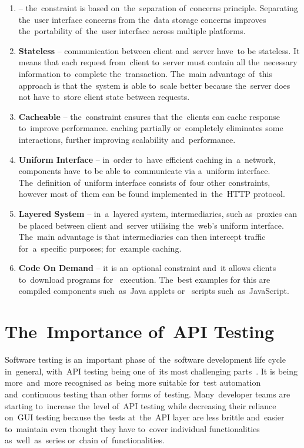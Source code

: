 \begin{enumerate}
  \item \textbf{} -- the~constraint is based
  on~the~separation of~concerns principle. Separating the~user interface
  concerns from the~data storage concerns improves the~portability of~the~user
  interface across multiple platforms.
  \item \textbf{Stateless} -- communication between client and~server have~to be
  stateless. It means that each request from~client to~server must contain all
  the~necessary information to~complete the~transaction. The~main advantage
  of~this approach is that the~system is able to~scale better because the~server
  does not have to~store client state between requests.
  \item \textbf{Cacheable} -- the~constraint ensures that the~clients can cache
  response to~improve performance.  caching partially
  or~completely eliminates some  interactions, further
  improving scalability and~performance.
  \item \textbf{Uniform Interface} -- in~order to~have efficient caching
  in~a~network, components have~to be able to~communicate via a~uniform
  interface.
  The~definition of~uniform interface consists of~four other constraints,
  however most of~them can be found implemented in~the~HTTP protocol.
  \item \textbf{Layered System} -- in~a~layered system, intermediaries, such
  as~proxies can be placed between client and~server utilising the~web's uniform
  interface. The~main advantage is that intermediaries can then intercept
   traffic for~a~specific purposes; for~example caching.
  \item \textbf{Code On Demand} -- it is an~optional constraint and~it allows
  clients to~download programs for~ execution. The~best examples
  for this are compiled components such~as~Java applets or~
  scripts such~as~JavaScript.
\end{enumerate}



\section{The~Importance of~API Testing}
\label{frameworks}
Software testing is an~important phase of~the~software development life cycle
in~general, with~API testing being one of~its most challenging
parts~\cite{TestingAPI}. It is being more~and~more recognised as~being more
suitable for~test automation and~continuous testing than other forms of~testing.
Many~developer teams are starting to~increase the~level of~API testing while
decreasing their reliance on~GUI testing because the~tests at~the~API layer are
less brittle and~easier to~maintain even thought they have to~cover
individual functionalities as~well~as~series or~chain of~functionalities.

